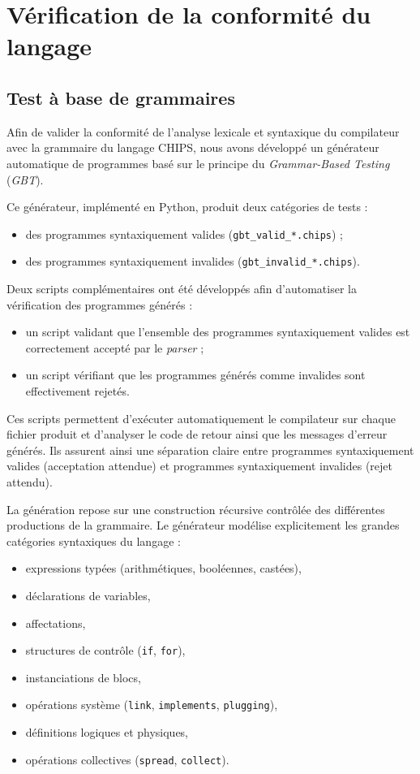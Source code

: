 \documentclass[a4paper, 11pt]{article}
\DeclareRobustCommand{\prog}[1]{\begingroup\urlstyle{tt}\nolinkurl{#1}\endgroup}
\begin{document}
\newpage
\section{Vérification de la conformité du langage}
\label{sec:verification_conformite}

\subsection{Test à base de grammaires}

Afin de valider la conformité de l’analyse lexicale et syntaxique du compilateur avec la grammaire du langage CHIPS, nous avons développé un générateur automatique de programmes basé sur le principe du \emph{Grammar-Based Testing} (\emph{GBT}).

Ce générateur, implémenté en Python, produit deux catégories de tests :
\begin{itemize}
    \item des programmes syntaxiquement valides (\prog{gbt\_valid\_*.chips}) ;
    \item des programmes syntaxiquement invalides (\prog{gbt\_invalid\_*.chips}).
\end{itemize}

Deux scripts complémentaires ont été développés afin d’automatiser la vérification des programmes générés :

\begin{itemize}
    \item un script validant que l’ensemble des programmes syntaxiquement valides est correctement accepté par le \emph{parser} ;
    \item un script vérifiant que les programmes générés comme invalides sont effectivement rejetés.
\end{itemize}

Ces scripts permettent d’exécuter automatiquement le compilateur sur chaque fichier produit et d’analyser le code de retour ainsi que les messages d’erreur générés. Ils assurent ainsi une séparation claire entre programmes syntaxiquement valides (acceptation attendue) et programmes syntaxiquement invalides (rejet attendu).

La génération repose sur une construction récursive contrôlée des différentes productions de la grammaire. Le générateur modélise explicitement les grandes catégories syntaxiques du langage :
\begin{itemize}
    \item expressions typées (arithmétiques, booléennes, castées),
    \item déclarations de variables,
    \item affectations,
    \item structures de contrôle (\prog{if}, \prog{for}),
    \item instanciations de blocs,
    \item opérations système (\prog{link}, \prog{implements}, \prog{plugging}),
    \item définitions logiques et physiques,
    \item opérations collectives (\prog{spread}, \prog{collect}).
\end{itemize}
\end{document}
